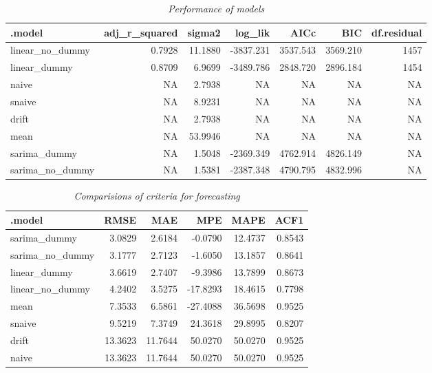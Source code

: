 \begin{table}[!h]
    \centering
    \caption{\small \textit{Performance of models}}
    \centering
    \begin{tabular}[t]{lrrrrrr}
    \toprule
    .model & adj\_r\_squared & sigma2 & log\_lik & AICc & BIC & df.residual\\
    \midrule
    linear\_no\_dummy & 0.7928 & 11.1880 & -3837.231 & 3537.543 & 3569.210 & 1457\\
    linear\_dummy & 0.8709 & 6.9699 & -3489.786 & 2848.720 & 2896.184 & 1454\\
    naive & NA & 2.7938 & NA & NA & NA & NA\\
    snaive & NA & 8.9231 & NA & NA & NA & NA\\
    drift & NA & 2.7938 & NA & NA & NA & NA\\
    \addlinespace
    mean & NA & 53.9946 & NA & NA & NA & NA\\
    sarima\_dummy & NA & 1.5048 & -2369.349 & 4762.914 & 4826.149 & NA\\
    sarima\_no\_dummy & NA & 1.5381 & -2387.348 & 4790.795 & 4832.996 & NA\\
    \bottomrule
    \end{tabular}
\end{table}

\begin{table}[!h]
    \centering
    \caption{\small \textit{Comparisions of criteria for forecasting}}
    \centering
    \begin{tabular}[t]{lrrrrr}
    \toprule
    .model & RMSE & MAE & MPE & MAPE & ACF1\\
    \midrule
    sarima\_dummy & 3.0829 & 2.6184 & -0.0790 & 12.4737 & 0.8543\\
    sarima\_no\_dummy & 3.1777 & 2.7123 & -1.6050 & 13.1857 & 0.8641\\
    linear\_dummy & 3.6619 & 2.7407 & -9.3986 & 13.7899 & 0.8673\\
    linear\_no\_dummy & 4.2402 & 3.5275 & -17.8293 & 18.4615 & 0.7798\\
    mean & 7.3533 & 6.5861 & -27.4088 & 36.5698 & 0.9525\\
    \addlinespace
    snaive & 9.5219 & 7.3749 & 24.3618 & 29.8995 & 0.8207\\
    drift & 13.3623 & 11.7644 & 50.0270 & 50.0270 & 0.9525\\
    naive & 13.3623 & 11.7644 & 50.0270 & 50.0270 & 0.9525\\
    \bottomrule
    \end{tabular}
\end{table}

